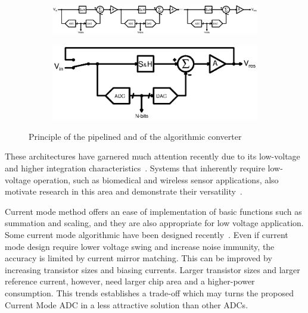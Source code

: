 \begin{figure}[htp]
	\centering
    \begin{subfigure}[b]{\textwidth}
        \includegraphics[width=\textwidth]{Chapter2/Figs/Vector/pipelined.ps}
        \vspace{2em}
        \label{fig:pipelined-principle}
	\end{subfigure}
	\begin{subfigure}[b]{0.4\textwidth}
        \includegraphics[width=\textwidth]{Chapter2/Figs/Vector/algorithmic.ps}
        \label{fig:algorithmic-principle}
    \end{subfigure}
	\caption{Principle of the pipelined and of the algorithmic converter}
	\label{fig:algo_desc}
\end{figure}

These architectures have garnered much attention recently due to its low-voltage and higher integration characteristics~\cite{Steyaert2012,Lee2011,SKLee2011,Brooks2009,Hershberg2012,YLim2015,YLim2015FD,Megawer2016,YCao2017}. Systems that inherently require low-voltage operation, such as biomedical and wireless sensor applications, also motivate research in this area and demonstrate their versatility~\cite{Steyaert2012,Lee2011,SKLee2011}.


Current mode method offers an ease of implementation of basic functions such as summation and scaling, and they are also appropriate for low voltage application. Some current mode algorithmic have been designed recently~\cite{Nairn1990,Wang1991,Khodabndehloo2009,Bhatia2011}. Even if current mode design require lower voltage swing and increase noise immunity, the accuracy is limited by current mirror matching. This can be improved by increasing transistor sizes and biasing currents. Larger transistor sizes and larger reference current, however, need larger chip area and a higher-power consumption. This trends establishes a trade-off which may turns the proposed Current Mode ADC in a less attractive solution than other ADCs\cite{Wang1991}. 

